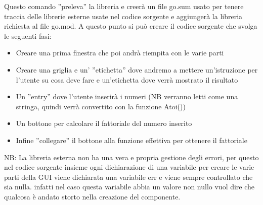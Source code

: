 Questo comando ''preleva'' la libreria e creerà un file go.sum usato per tenere traccia delle librerie esterne usate nel codice sorgente e aggiungerà la libreria richiesta al file go.mod. 
A questo punto si può creare il codice sorgente che svolga  le seguenti fasi:
\begin{itemize}
\item Creare una prima finestra che poi andrà riempita con le varie parti
\item Creare una griglia e un' ''etichetta'' dove andremo a mettere un'istruzione per l'utente su cosa deve fare e un'etichetta dove verrà mostrato il risultato
\item Un ''entry'' dove l'utente inserirà i numeri (NB  verranno letti come una stringa, quindi verrà convertito con la funzione Atoi())
\item Un bottone per calcolare il fattoriale del numero inserito
\item Infine ''collegare'' il bottone alla funzione effettiva per ottenere il fattoriale
\end{itemize}
NB: La libreria esterna non ha una vera e propria gestione degli errori, per questo nel codice sorgente insieme ogni dichiarazione di una variabile per creare le varie parti della GUI viene dichiarata una variabile err e viene sempre controllato che sia nulla. infatti nel caso questa variabile abbia un valore non nullo vuol dire che qualcosa è andato storto nella creazione del componente.
